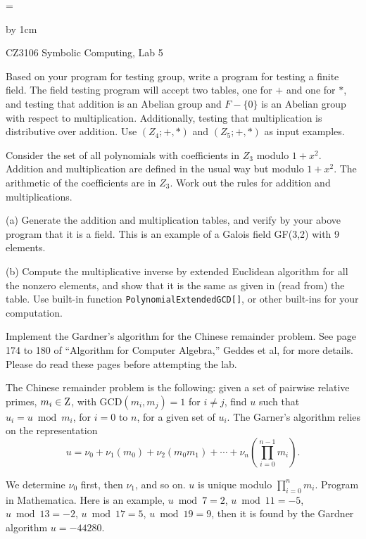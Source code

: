 \magnification=

\advance\vsize by 1cm
\nopagenumbers

\centerline{\titlefont CZ3106 Symbolic Computing, Lab 5}
\bigskip
{}
\medskip
{}
\bigskip

\problem Based on your program for testing group, write a program for
testing a finite field.  The field testing program will accept two
tables, one for $+$ and one for $*$, and testing that addition is 
an Abelian group and $F-\{0\}$ is an Abelian group with respect to
multiplication.  Additionally, testing that multiplication is 
distributive over addition.   Use $(Z_4; +, *)$ and 
$(Z_5; +, *)$ as input examples.

\bigskip
\problem Consider the set of all polynomials with coefficients in $Z_3$ 
modulo $1+x^2$.   Addition and multiplication are defined
in the usual way but modulo $1+x^2$.  The arithmetic of the 
coefficients are in $Z_3$.  Work out the rules for addition and
multiplications.
\item{} (a) Generate the addition and multiplication tables, and verify
by your above program that it is a field.  This is an example
of a Galois field GF(3,2) with 9 elements. 
\item{} (b) Compute the multiplicative inverse by extended Euclidean algorithm 
for all the
nonzero elements, and show that it is the same as given in (read from) the
table.  Use built-in function {\tt PolynomialExtendedGCD[]}, or other
built-ins for your computation.

\bigskip
\problem Implement the Gardner's algorithm for the Chinese remainder 
problem.  See page 174 to 180 of ``Algorithm for Computer
Algebra,'' Geddes et al, for more details.  Please do read these 
pages before attempting the lab.
\item{} The Chinese remainder problem is the following: given a set of 
pairwise relative primes, $m_i \in {\rm Z}$, with  GCD$(m_i, m_j) = 1$ for
$i \neq j$,  find $u$ such that $u_i = u \bmod m_i$, for $i=0$ to $n$,
for a given set of $u_i$.   The Garner's algorithm relies on  
the representation
$$ u = \nu_0 + \nu_1(m_0)+\nu_2(m_0 m_1)+\cdots+\nu_n (\prod_{i=0}^{n-1} m_i).$$
\item{} We determine $\nu_0$ first, then $\nu_1$, and so on. 
$u$ is unique modulo $\prod_{i=0}^n m_i$. 
Program in Mathematica.  Here is an example,  $u \bmod 7 = 2$,
$u \bmod 11 = -5$, $u \bmod 13 = -2$, $u \bmod 17 = 5$, $u \bmod 19 = 9$, 
then it is found by the Gardner algorithm $u=-44280$.




\bye


